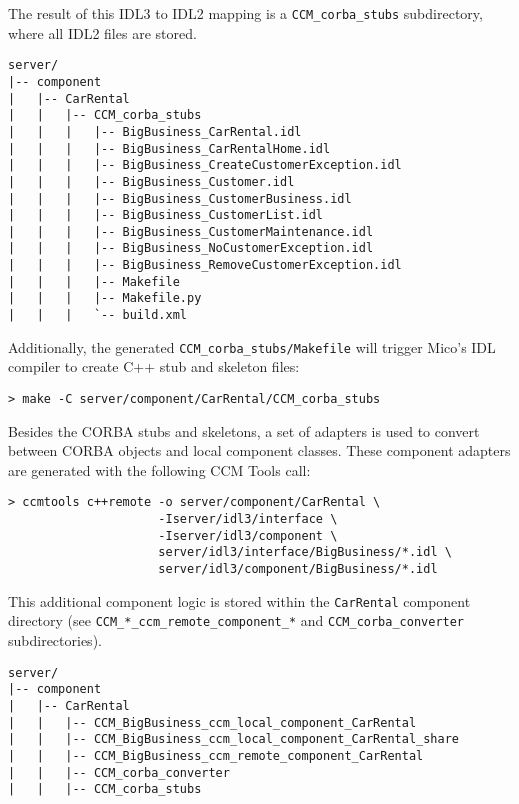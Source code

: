 The result of this IDL3 to IDL2 mapping is a {\tt CCM\_corba\_stubs} 
subdirectory, where all IDL2 files are stored.
\begin{small}
\begin{verbatim}
server/
|-- component
|   |-- CarRental
|   |   |-- CCM_corba_stubs
|   |   |   |-- BigBusiness_CarRental.idl
|   |   |   |-- BigBusiness_CarRentalHome.idl
|   |   |   |-- BigBusiness_CreateCustomerException.idl
|   |   |   |-- BigBusiness_Customer.idl
|   |   |   |-- BigBusiness_CustomerBusiness.idl
|   |   |   |-- BigBusiness_CustomerList.idl
|   |   |   |-- BigBusiness_CustomerMaintenance.idl
|   |   |   |-- BigBusiness_NoCustomerException.idl
|   |   |   |-- BigBusiness_RemoveCustomerException.idl
|   |   |   |-- Makefile
|   |   |   |-- Makefile.py
|   |   |   `-- build.xml
\end{verbatim}
\end{small}

Additionally, the generated  {\tt CCM\_corba\_stubs/Makefile} will
trigger Mico's IDL compiler to create C++ stub and skeleton files:
\begin{small}
\begin{verbatim}
> make -C server/component/CarRental/CCM_corba_stubs
\end{verbatim}
\end{small}

Besides the CORBA stubs and skeletons, a set of adapters is used to
convert between CORBA objects and local component classes.
These component adapters are generated with the following CCM Tools call:
\begin{small}
\begin{verbatim}
> ccmtools c++remote -o server/component/CarRental \
                     -Iserver/idl3/interface \
                     -Iserver/idl3/component \
                     server/idl3/interface/BigBusiness/*.idl \
                     server/idl3/component/BigBusiness/*.idl
\end{verbatim}
\end{small}

This additional component logic is stored within the {\tt CarRental}
component directory (see {\tt CCM\_*\_ccm\_remote\_component\_*} and 
{\tt CCM\_corba\_converter} subdirectories).
\begin{small}
\begin{verbatim}
server/
|-- component
|   |-- CarRental
|   |   |-- CCM_BigBusiness_ccm_local_component_CarRental
|   |   |-- CCM_BigBusiness_ccm_local_component_CarRental_share
|   |   |-- CCM_BigBusiness_ccm_remote_component_CarRental
|   |   |-- CCM_corba_converter
|   |   |-- CCM_corba_stubs
\end{verbatim}
\end{small}

